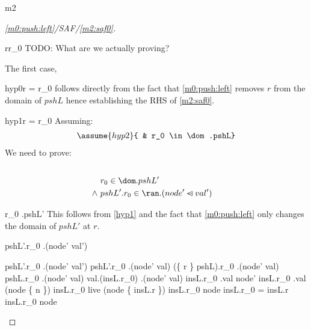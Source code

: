 \documentclass[12pt]{amsart}
\begin{document}
\begin{machine}{m2}
\newcommand{\finter}{\binter}
\begin{proof}[\ref{m0:push:left}/SAF/\ref{m2:saf0}]
	\begin{free:var}{r}{r_0}
	TODO: What are we actually proving?
	\begin{by:cases}
	The first case,
	\begin{case}{hyp0}{r = r_0}
		follows directly from the fact that \ref{m0:push:left} removes
		$r$ from the domain of $pshL$ hence establishing the RHS of \eqref{m2:saf0}.
		\easy
	\end{case}		
	\begin{case}{hyp1}{\neg r = r_0}
		Assuming:
		\begin{align*}
		\assume{hyp2}{ & r_0 \in \dom.pshL}
		\end{align*}
		We need to prove:
		\begin{align*}
		\\ \goal{& r_0 \in \dom.pshL' 
		\\	\land ~ & pshL'.r_0 \in \ran.(node' \domsub val') }
		\end{align*}
		\begin{by:parts}
		\begin{part:a}{ r_0 \in \dom.pshL' }
		This follows from \eqref{hyp1} and the fact that \ref{m0:push:left} only changes the domain of $pshL'$ at $r$.
			\easy
		\end{part:a}
		\begin{part:a}{pshL'.r_0 \in \ran.(node' \domsub val')}
		\begin{calculation}
			pshL'.r_0 \in \ran.(node' \domsub val')
			pshL'.r_0 \in \ran.(node'  \domsub val)
			(\{ r \} \domsub pshL).r_0 \in 
			\ran.(node' \domsub val)
		\hint{=}{ \eqref{hyp1} }
			pshL.r_0 \in \ran.(node' \domsub val)
			val.(insL.r_0) \in \ran.(node' \domsub val)
		\hint{\follows}{  }
			insL.r_0 \in \dom.val \setminus node'
		\hint{=}{ \eqref{m2:a1} }
			insL.r_0 \in 
					\dom.val \setminus (node \bunion \{ n \}) 
		\hint{=}{ \eqref{m2:inv1} ,
				  \eqref{m2:inv6} ,
				  \eqref{m2:grd2} }
			insL.r_0 \in live \setminus (node \bunion \{ insL.r \}) 
		\hint{=}{ 	\eqref{hyp2} ,
					\eqref{m2:inv5} }
			\neg insL.r_0 \in node \1\land \neg insL.r_0 = insL.r
		\hint{=}{ \eqref{m2:inv7}, 
				\eqref{hyp1}, 
				\eqref{hyp2}, 
				\eqref{m1:grd1},
				\eqref{m2:inv5} }
			\neg insL.r_0 \in node
		\hint{\follows}{ \eqref{m2:inv8}; 
				\eqref{hyp2}; 
				\eqref{m2:inv5} }
			\true
		\end{calculation}
		\end{part:a}
		\end{by:parts}
	\end{case}		
	\end{by:cases}
	\end{free:var}
\end{proof}


\end{machine}
\end{document}
